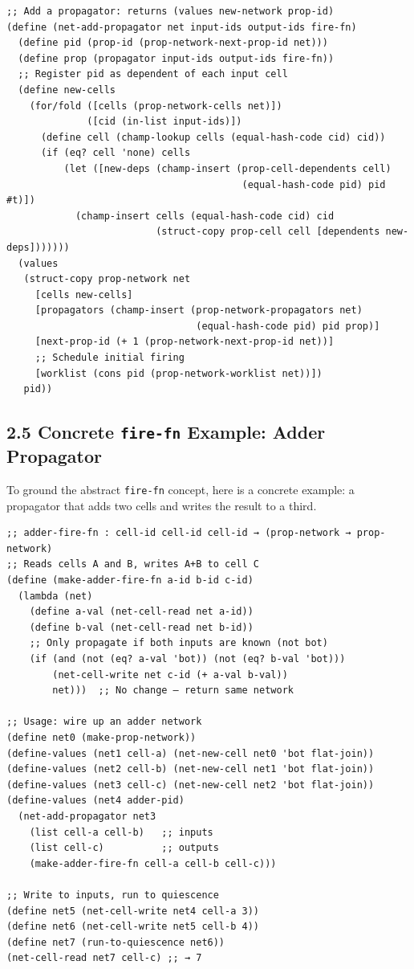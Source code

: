 \documentclass[11pt]{article}
\begin{document}
\begin{verbatim}
;; Add a propagator: returns (values new-network prop-id)
(define (net-add-propagator net input-ids output-ids fire-fn)
  (define pid (prop-id (prop-network-next-prop-id net)))
  (define prop (propagator input-ids output-ids fire-fn))
  ;; Register pid as dependent of each input cell
  (define new-cells
    (for/fold ([cells (prop-network-cells net)])
              ([cid (in-list input-ids)])
      (define cell (champ-lookup cells (equal-hash-code cid) cid))
      (if (eq? cell 'none) cells
          (let ([new-deps (champ-insert (prop-cell-dependents cell)
                                         (equal-hash-code pid) pid #t)])
            (champ-insert cells (equal-hash-code cid) cid
                          (struct-copy prop-cell cell [dependents new-deps]))))))
  (values
   (struct-copy prop-network net
     [cells new-cells]
     [propagators (champ-insert (prop-network-propagators net)
                                 (equal-hash-code pid) pid prop)]
     [next-prop-id (+ 1 (prop-network-next-prop-id net))]
     ;; Schedule initial firing
     [worklist (cons pid (prop-network-worklist net))])
   pid))
\end{verbatim}
\subsection{2.5 Concrete \texttt{fire-fn} Example: Adder Propagator}
\label{sec:orgf45225f}

To ground the abstract \texttt{fire-fn} concept, here is a concrete example: a
propagator that adds two cells and writes the result to a third.

\begin{verbatim}
;; adder-fire-fn : cell-id cell-id cell-id → (prop-network → prop-network)
;; Reads cells A and B, writes A+B to cell C
(define (make-adder-fire-fn a-id b-id c-id)
  (lambda (net)
    (define a-val (net-cell-read net a-id))
    (define b-val (net-cell-read net b-id))
    ;; Only propagate if both inputs are known (not bot)
    (if (and (not (eq? a-val 'bot)) (not (eq? b-val 'bot)))
        (net-cell-write net c-id (+ a-val b-val))
        net)))  ;; No change — return same network

;; Usage: wire up an adder network
(define net0 (make-prop-network))
(define-values (net1 cell-a) (net-new-cell net0 'bot flat-join))
(define-values (net2 cell-b) (net-new-cell net1 'bot flat-join))
(define-values (net3 cell-c) (net-new-cell net2 'bot flat-join))
(define-values (net4 adder-pid)
  (net-add-propagator net3
    (list cell-a cell-b)   ;; inputs
    (list cell-c)          ;; outputs
    (make-adder-fire-fn cell-a cell-b cell-c)))

;; Write to inputs, run to quiescence
(define net5 (net-cell-write net4 cell-a 3))
(define net6 (net-cell-write net5 cell-b 4))
(define net7 (run-to-quiescence net6))
(net-cell-read net7 cell-c) ;; → 7
\end{verbatim}
\end{document}
